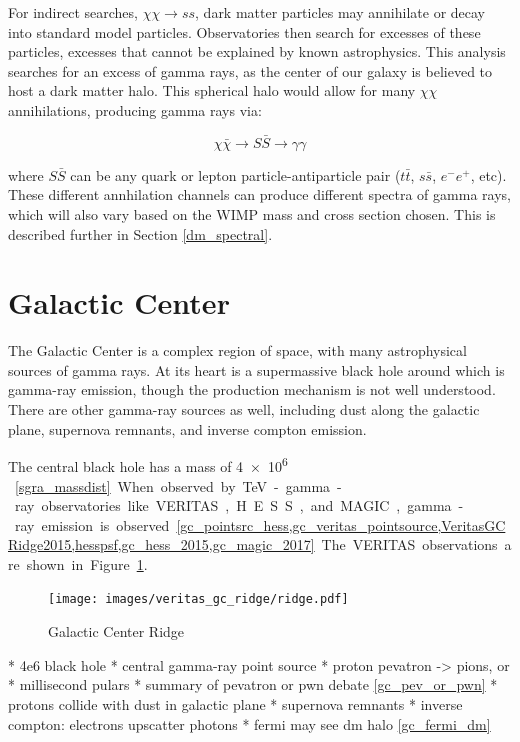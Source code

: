     For indirect searches, $\chi\chi \rightarrow ss$, dark matter particles may annihilate or decay into standard model particles.
    Observatories then search for excesses of these particles, excesses that cannot be explained by known astrophysics.
    This analysis searches for an excess of gamma rays, as the center of our galaxy is believed to host a dark matter halo.
    This spherical halo would allow for many $\chi\chi$ annihilations, producing gamma rays via: 
    
    $$\chi\bar{\chi} \rightarrow S\bar{S} \rightarrow \gamma\gamma$$

    where $S\bar{S}$ can be any quark or lepton particle-antiparticle pair ($t\bar{t}$, $s\bar{s}$, $e^{-}e^{+}$, etc).
    These different annhilation channels can produce different spectra of gamma rays, which will also vary based on the WIMP mass and cross section chosen.
    This is described further in Section \ref{dm_spectral}.

\FloatBarrier

\section{Galactic Center}
  
  The Galactic Center is a complex region of space, with many astrophysical sources of gamma rays.
  At its heart is a supermassive black hole around which is gamma-ray emission, though the production mechanism is not well understood.
  There are other gamma-ray sources as well, including dust along the galactic plane, supernova remnants, and inverse compton emission.
  
  The central black hole has a mass of \SI{4e6}{ \Msol{} }~\ref{sgra_massdist}.
  When observed by TeV-gamma-ray observatories like VERITAS, H.E.S.S., and MAGIC, gamma-ray emission is observed~\ref{gc_pointsrc_hess,gc_veritas_pointsource,VeritasGCRidge2015,hesspsf,gc_hess_2015,gc_magic_2017}
  The VERITAS observations are shown in Figure~\ref{fig:veritas_gc_ridge}.
  
  \begin{figure}[ht]
    \texttt{[image: images/veritas\_gc\_ridge/ridge.pdf]}
    \caption[VERITAS View of the Galactic Center Ridge]{
      Galactic Center Ridge
      \CaptionBlankLine
    }
    \label{fig:veritas_gc_ridge}
  \end{figure}
  
  
  * 4e6 \Msol black hole
  * central gamma-ray point source
    * proton pevatron -> pions, or
    * millisecond pulars
    * summary of pevatron or pwn debate \ref{gc_pev_or_pwn}
  * protons collide with dust in galactic plane
  * supernova remnants
  * inverse compton: electrons upscatter photons
  * fermi may see dm halo \ref{gc_fermi_dm}



